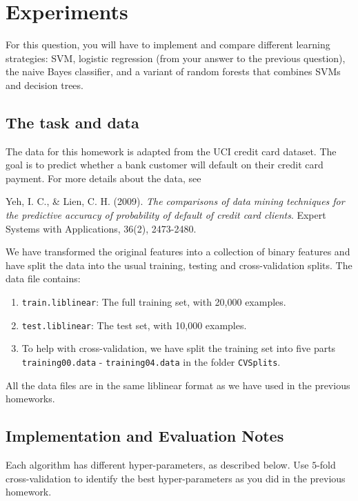 \section{Experiments}\label{sec:q2}

For this question, you will have to implement and compare different
learning strategies: SVM, logistic regression (from your answer to
the previous question), the naive Bayes classifier, and a variant of
random forests that combines SVMs and decision trees.

\subsection{The task and data}

The data for this homework is adapted from the UCI credit card
dataset. The goal is to predict whether a bank customer will default
on their credit card payment. For more details about the data, see

\noindent Yeh, I. C., \& Lien, C. H. (2009). {\em The comparisons of
  data mining techniques for the predictive accuracy of probability
  of default of credit card clients}. Expert Systems with
Applications, 36(2), 2473-2480.

We have transformed the original features into a collection of
binary features and have split the data into the usual training,
testing and cross-validation splits. The data file contains:

\begin{enumerate}
\item {\tt train.liblinear}: The full training set, with 20,000
  examples.
\item {\tt test.liblinear}: The test set, with 10,000 examples.
\item To help with cross-validation, we have split the training set
  into five parts {\tt training00.data} - {\tt training04.data} in
  the folder {\tt CVSplits}.
\end{enumerate}

All the data files are in the same liblinear format as we have used
in the previous homeworks.

\subsection{Implementation and Evaluation Notes}

Each algorithm has different hyper-parameters, as described below.
Use $5$-fold cross-validation to identify the best hyper-parameters
as you did in the previous homework.

